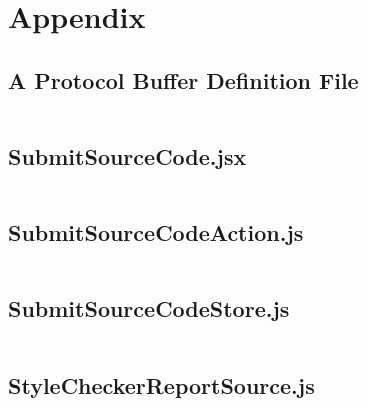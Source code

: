 \chapter{Appendix}

\section{A Protocol Buffer Definition File}  \label{appendix:protocol_buffer}
\inputminted[frame=none,baselinestretch=1.0,fontsize=\footnotesize]{python}{codes/style_check.proto}

\section{SubmitSourceCode.jsx} \label{appendix:SubmitSourceCode.jsx}
\inputminted[frame=none,baselinestretch=1.0,fontsize=\footnotesize]{js}{codes/SubmitSourceCode.jsx}

\section{SubmitSourceCodeAction.js} \label{appendix:SubmitSourceCodeAction.js}
\inputminted[frame=none,baselinestretch=1.0,fontsize=\footnotesize]{js}{codes/SubmitSourceCodeAction.js}

\section{SubmitSourceCodeStore.js} \label{appendix:SubmitSourceCodeStore.js}
\inputminted[frame=none,baselinestretch=1.0,fontsize=\footnotesize]{js}{codes/SubmitSourceCodeStore.js}

\section{StyleCheckerReportSource.js} \label{appendix:StyleCheckerReportSource.js}
\inputminted[frame=none,baselinestretch=1.0,fontsize=\footnotesize]{js}{codes/StyleCheckerReportSource.js}
